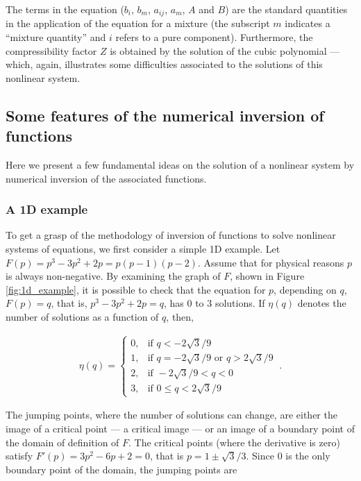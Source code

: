 \documentclass[journal=iecred,manuscript=article]{achemso}
\theoremstyle{definition}
\theoremstyle{remark}
\begin{document}
The terms in the equation ($b_i$, $b_m$, $a_{ij}$, $a_m$, $A$ and $B$) are the standard quantities in the application of the \citet{peng_robinson} equation for a mixture (the subscript $m$ indicates a ``mixture quantity'' and $i$ refers to a pure component). Furthermore, the compressibility factor $Z$ is obtained by the solution of the cubic polynomial --- which, again, illustrates some difficulties associated to the solutions of this nonlinear system.

\subsection{Some features of the numerical 
 inversion of 
functions}
Here we present a few fundamental ideas on the solution 
of a nonlinear system by numerical inversion of the
associated functions.
\subsubsection{A 1D example}
To get a grasp of the methodology of inversion of functions to 
solve nonlinear systems of equations, we first consider a 
simple 1D example.
Let $F(p)=p^3-3p^2+ 2p=p(p-1)(p-2)$. 
Assume that for physical reasons $p$ is always non-negative.
By examining the graph of $F$, shown in Figure \ref{fig:1d_example}, it is possible to 
check that the equation for $p$, depending on $q$, $F(p)=q$, that is, $p^3-3p^2+ 2p=q$,
has 0 to 3 solutions. If $\eta(q)$ denotes the 
number of solutions as a function of $q$, then, 
\begin{small}
\begin{eqnarray*}
\eta(q)= \left\{ 
\begin{array}{rl}
0 , & \text{if } q< -2\sqrt{3}/9\\
1, & \text{if } q= -2\sqrt{3}/9 \text{ or } q > 2\sqrt{3}/9\\
2 , & \text{if }  -2\sqrt{3}/9 < q  < 0 \\
3 , & \text{if } 0\leq q< 2\sqrt{3}/9
\end{array}\: .
\right.
\end{eqnarray*}
\end{small}
The jumping points, where 
 the number of solutions can change, are either the
 image of a critical point --- a critical image ---
 or an image of a boundary point of the domain of definition
 of $F$.
  The critical points
(where the derivative is zero) satisfy
$F'(p)=3p^2-6p+2 = 0$, that is $p=1 \pm \sqrt{3}/3$. Since 0 is the only boundary point of the domain,
 the jumping points are 
\end{document}
